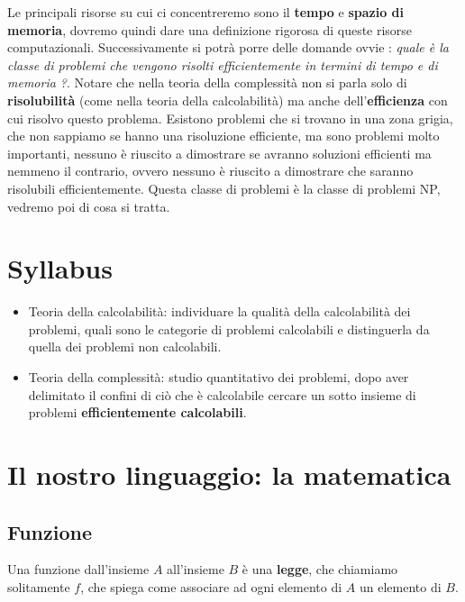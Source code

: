 \documentclass{article}
\begin{document}
Le principali risorse su cui ci concentreremo sono il \textbf{tempo} e \textbf{spazio di memoria}, dovremo quindi dare una definizione rigorosa di queste risorse computazionali. Successivamente si potrà porre delle domande ovvie : \textit{quale è la classe di problemi che vengono risolti efficientemente in termini di tempo e di memoria ?}. Notare che nella teoria della complessità non si parla solo di \textbf{risolubilità} (come nella teoria della calcolabilità) ma anche dell'\textbf{efficienza} con cui risolvo questo problema.
\newline
Esistono problemi che si trovano in una zona grigia, che non sappiamo se hanno una risoluzione efficiente, ma sono problemi molto importanti, nessuno è riuscito a dimostrare se avranno soluzioni efficienti ma nemmeno il contrario, ovvero nessuno è riuscito a dimostrare che saranno risolubili efficientemente. Questa classe di problemi è la classe di problemi NP, vedremo poi di cosa si tratta.
\section{Syllabus}
\begin{itemize}
    \item Teoria della calcolabilità: individuare la qualità della calcolabilità dei problemi, quali sono le categorie di problemi calcolabili e distinguerla da quella dei problemi non calcolabili.
    \item Teoria della complessità: studio quantitativo dei problemi, dopo aver delimitato il confini di ciò che è calcolabile cercare un sotto insieme di problemi \textbf{efficientemente calcolabili}.
\end{itemize}

\pagebreak
\section{Il nostro linguaggio: la matematica}
\subsection{Funzione}
Una funzione dall'insieme $A$ all'insieme $B$ è una \textbf{legge}, che chiamiamo solitamente $f$, che spiega come associare ad ogni elemento di $A$ un elemento di $B$.
\newline
\end{document}
